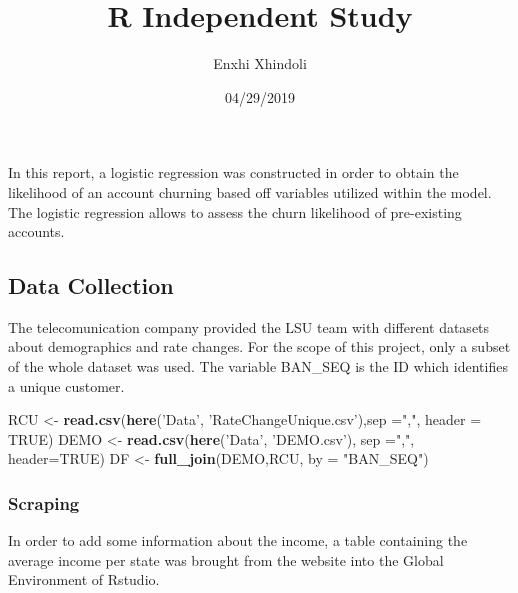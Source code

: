 \documentclass[]{article}
\title{R Independent Study}
\author{Enxhi Xhindoli}
\date{04/29/2019}
\newenvironment{Shaded}{\begin{snugshade}}{\end{snugshade}}
\newcommand{\KeywordTok}[1]{\textcolor[rgb]{0.13,0.29,0.53}{\textbf{#1}}}
\newcommand{\DataTypeTok}[1]{\textcolor[rgb]{0.13,0.29,0.53}{#1}}
\newcommand{\StringTok}[1]{\textcolor[rgb]{0.31,0.60,0.02}{#1}}
\newcommand{\OtherTok}[1]{\textcolor[rgb]{0.56,0.35,0.01}{#1}}
\newcommand{\OperatorTok}[1]{\textcolor[rgb]{0.81,0.36,0.00}{\textbf{#1}}}
\newcommand{\NormalTok}[1]{#1}
\begin{document}
\maketitle

{
\hypersetup{linkcolor=black}
\setcounter{tocdepth}{2}
\tableofcontents
}
In this report, a logistic regression was constructed in order to obtain
the likelihood of an account churning based off variables utilized
within the model. The logistic regression allows to assess the churn
likelihood of pre-existing accounts.

\subsection{Data Collection}\label{data-collection}

The telecomunication company provided the LSU team with different
datasets about demographics and rate changes. For the scope of this
project, only a subset of the whole dataset was used. The variable
BAN\_SEQ is the ID which identifies a unique customer.

\begin{Shaded}
\begin{Highlighting}[]
\NormalTok{RCU <-}\StringTok{ }\KeywordTok{read.csv}\NormalTok{(}\KeywordTok{here}\NormalTok{(}\StringTok{'Data'}\NormalTok{, }\StringTok{'RateChangeUnique.csv'}\NormalTok{),}\DataTypeTok{sep =}\StringTok{","}\NormalTok{, }\DataTypeTok{header =} \OtherTok{TRUE}\NormalTok{)}
\NormalTok{DEMO <-}\StringTok{ }\KeywordTok{read.csv}\NormalTok{(}\KeywordTok{here}\NormalTok{(}\StringTok{'Data'}\NormalTok{, }\StringTok{'DEMO.csv'}\NormalTok{), }\DataTypeTok{sep =}\StringTok{","}\NormalTok{, }\DataTypeTok{header=}\OtherTok{TRUE}\NormalTok{)}
\NormalTok{DF <-}\StringTok{ }\KeywordTok{full_join}\NormalTok{(DEMO,RCU, }\DataTypeTok{by =} \StringTok{"BAN_SEQ"}\NormalTok{)}
\end{Highlighting}
\end{Shaded}

\subsubsection{Scraping}\label{scraping}

In order to add some information about the income, a table containing
the average income per state was brought from the website into the
Global Environment of Rstudio.

\begin{Shaded}
\end{Shaded}
\end{document}
